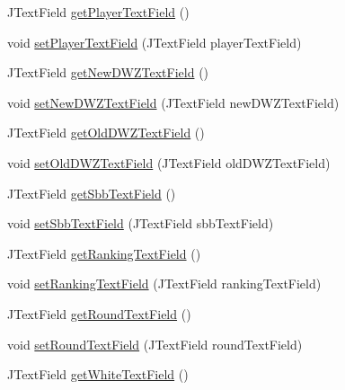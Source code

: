 \begin{DoxyCompactItemize}
J\+Text\+Field \hyperlink{classde_1_1turnierverwaltung_1_1view_1_1_settings_view_a14da1f40b038898f2de4488abfa3344f}{get\+Player\+Text\+Field} ()
\item 
void \hyperlink{classde_1_1turnierverwaltung_1_1view_1_1_settings_view_a74ff95562160009cc9d697f18caa1db6}{set\+Player\+Text\+Field} (J\+Text\+Field player\+Text\+Field)
\item 
J\+Text\+Field \hyperlink{classde_1_1turnierverwaltung_1_1view_1_1_settings_view_a9ef027f700d18f97ade85a93698b5547}{get\+New\+D\+W\+Z\+Text\+Field} ()
\item 
void \hyperlink{classde_1_1turnierverwaltung_1_1view_1_1_settings_view_a3b6320029f10ca651e77eb2cdda8abe7}{set\+New\+D\+W\+Z\+Text\+Field} (J\+Text\+Field new\+D\+W\+Z\+Text\+Field)
\item 
J\+Text\+Field \hyperlink{classde_1_1turnierverwaltung_1_1view_1_1_settings_view_a31f85001f5ed48b1437db063e1bfacc0}{get\+Old\+D\+W\+Z\+Text\+Field} ()
\item 
void \hyperlink{classde_1_1turnierverwaltung_1_1view_1_1_settings_view_a61333d8512b92d59b4c28301f6114cb1}{set\+Old\+D\+W\+Z\+Text\+Field} (J\+Text\+Field old\+D\+W\+Z\+Text\+Field)
\item 
J\+Text\+Field \hyperlink{classde_1_1turnierverwaltung_1_1view_1_1_settings_view_a974621803cbf964eab9ca81dd2d9d3bf}{get\+Sbb\+Text\+Field} ()
\item 
void \hyperlink{classde_1_1turnierverwaltung_1_1view_1_1_settings_view_ae0b17276e54f86f8792a7c9a3016eea0}{set\+Sbb\+Text\+Field} (J\+Text\+Field sbb\+Text\+Field)
\item 
J\+Text\+Field \hyperlink{classde_1_1turnierverwaltung_1_1view_1_1_settings_view_aa6a531dc9479232662d84eda30bab862}{get\+Ranking\+Text\+Field} ()
\item 
void \hyperlink{classde_1_1turnierverwaltung_1_1view_1_1_settings_view_a795af8fef57095f180cd06107fe3e1ca}{set\+Ranking\+Text\+Field} (J\+Text\+Field ranking\+Text\+Field)
\item 
J\+Text\+Field \hyperlink{classde_1_1turnierverwaltung_1_1view_1_1_settings_view_ae98a51262f0940830bd5cb809ff8a915}{get\+Round\+Text\+Field} ()
\item 
void \hyperlink{classde_1_1turnierverwaltung_1_1view_1_1_settings_view_a93539b5a0cf23ddefd63144baab39531}{set\+Round\+Text\+Field} (J\+Text\+Field round\+Text\+Field)
\item 
J\+Text\+Field \hyperlink{classde_1_1turnierverwaltung_1_1view_1_1_settings_view_ab33b60d334646af17d430c226672f798}{get\+White\+Text\+Field} ()

\end{DoxyCompactItemize}
